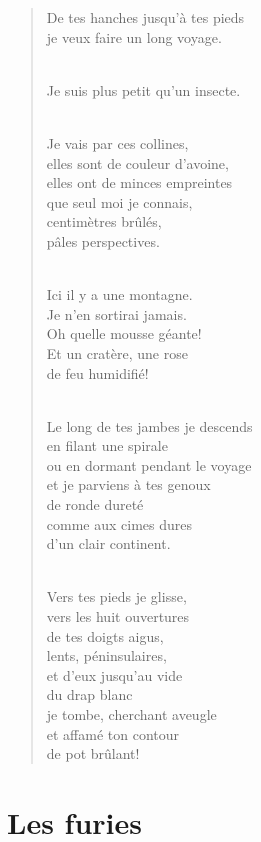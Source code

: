 \documentclass[11pt,a4paper]{book}
\begin{document}
\begin{verse}
De tes hanches jusqu'à tes pieds \\
je veux faire un long voyage. \\ \

Je suis plus petit qu'un insecte. \\ \

Je vais par ces collines, \\
elles sont de couleur d'avoine, \\
elles ont de minces empreintes \\
que seul moi je connais, \\
centimètres brûlés, \\
pâles perspectives. \\ \

Ici il y a une montagne. \\
Je n'en sortirai jamais. \\
Oh quelle mousse géante! \\
Et un cratère, une rose \\
de feu humidifié! \\ \

Le long de tes jambes je descends \\
en filant une spirale \\
ou en dormant pendant le voyage \\
et je parviens à tes genoux \\
de ronde dureté \\
comme aux cimes dures \\
d'un clair continent. \\ \

Vers tes pieds je glisse, \\
vers les huit ouvertures \\
de tes doigts aigus, \\
lents, péninsulaires, \\
et d'eux jusqu'au vide \\
du drap blanc \\
je tombe, cherchant aveugle \\
et affamé ton contour \\
de pot brûlant!
\end{verse}

\cleardoublepage

\part{Les furies}
\end{document}
